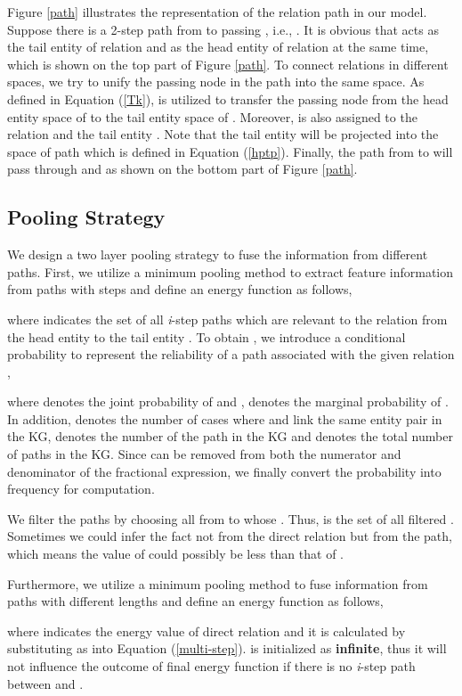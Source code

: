 \documentclass[11pt,a4paper]{article}
\begin{document}
Figure \ref{path} illustrates the representation of the relation
path in our model. Suppose there is a 2-step path from  to
 passing , i.e., . It is obvious that
 acts as the tail entity of relation 
and as the head entity of relation  at the
same time, which is shown on the top part of Figure \ref{path}. To
connect relations in different spaces, we try to unify the passing
node in the path into the same space. As defined in Equation
(\ref{Tk}),  is utilized to transfer the passing node 
from the head entity space of  to the tail entity space of
. Moreover,  is also assigned to the relation 
and the tail entity . Note that the tail entity  will be
projected into the space of path  which is defined in Equation
(\ref{hptp}). Finally, the path from  to  will pass
through  and  as shown on the bottom part of
Figure \ref{path}.


\subsection{Pooling Strategy}
We design a two layer pooling strategy to fuse the information from
different paths. First, we utilize a minimum pooling method to
extract feature information from paths with  steps and define an
energy function as follows,

where  indicates the set of all \emph{i}-step
paths which are relevant to the relation   from the head entity  to the tail entity . To obtain , we introduce a conditional probability
 to represent the reliability of a path  associated with the given relation ,

where  denotes the joint probability of  and
,  denotes the marginal probability of
. In addition,  denotes the number of cases where  and  link the same entity pair in the KG,  denotes the number of the path  in the KG and  denotes the total number of paths in the KG. Since  can be removed from both the numerator and denominator of the fractional expression, we finally convert the probability into frequency for computation.

We filter the paths by choosing all  from  to  whose
. Thus,  is the set of all filtered . Sometimes we could infer the fact not from the direct relation
 but from the path, which means the value of  could possibly be less than that of .

Furthermore, we utilize a minimum pooling method to fuse information
from paths with different lengths and define an energy function as
follows,

where  indicates the energy value of direct
relation  and it is calculated by substituting  as 
into Equation (\ref{multi-step}). 
is initialized as \textbf{infinite}, thus it will not influence the
outcome of final energy function if there is no \emph{i}-step path
between  and .
\end{document}
